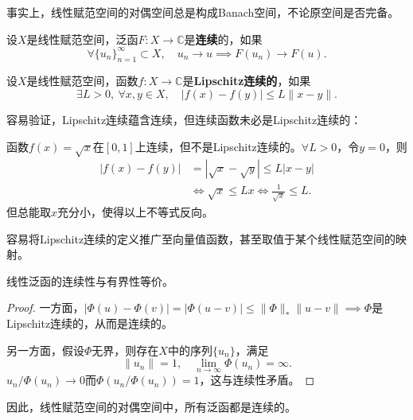 事实上，线性赋范空间的对偶空间总是构成Banach空间，不论原空间是否完备。

\begin{definition}[泛函的连续性]
    设$X$是线性赋范空间，泛函$F:X\to\mathbb{C}$是\textbf{连续}的，如果
    \begin{equation}
        \forall \{u_n\}_{n=1}^{\infty}\subset X,\quad u_n\to u\implies F(u_n)\to F(u).
    \end{equation}
\end{definition}

\begin{definition}[Lipschitz连续]
    设$X$是线性赋范空间，函数$f:X\to \mathbb{C}$是\textbf{Lipschitz连续的}，如果
    \begin{equation}
        \exists L>0,\ \forall x,y\in X,\quad |f(x)-f(y)|\leq L\|x-y\|.
    \end{equation}
\end{definition}

容易验证，Lipschitz连续蕴含连续，但连续函数未必是Lipschitz连续的：
\begin{example}
    函数$f(x)=\sqrt{x}$在$[0,1]$上连续，但不是Lipschitz连续的。$\forall L>0$，令$y=0$，则
    \begin{align}
        |f(x)-f(y)|&=|\sqrt{x}-\sqrt{y}|\leq L|x-y|\nonumber\\
        &\iff \sqrt{x}\leq Lx \iff \frac{1}{\sqrt{x}}\leq L.
    \end{align}
    但总能取$x$充分小，使得以上不等式反向。
\end{example}

容易将Lipschitz连续的定义推广至向量值函数，甚至取值于某个线性赋范空间的映射。

\begin{proposition}
    线性泛函的连续性与有界性等价。
\end{proposition}
\begin{proof}
    一方面，$|\Phi(u)-\Phi(v)|=|\Phi(u-v)|\leq\|\Phi\|_*\|u-v\|\implies\Phi$是Lipschitz连续的，从而是连续的。

    另一方面，假设$\Phi$无界，则存在$X$中的序列$\{u_n\}$，满足
    \begin{equation}
        \|u_n\|=1,\quad \lim_{n\to \infty}\Phi(u_n)=\infty.
    \end{equation}
    $u_n/\Phi(u_n)\to 0$而$\Phi(u_n/\Phi(u_n))=1$，这与连续性矛盾。
\end{proof}

因此，线性赋范空间的对偶空间中，所有泛函都是连续的。

